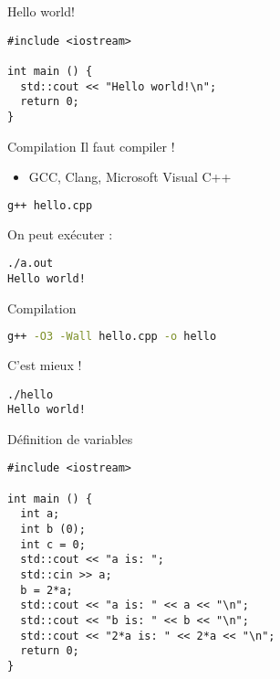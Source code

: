 
\begin{frame}[fragile]{Hello world!}
  \begin{lstlisting}
#include <iostream>

int main () {
  std::cout << "Hello world!\n";
  return 0;
}
  \end{lstlisting}
\end{frame}

\begin{frame}[fragile]{Compilation}
  Il faut compiler !
  \begin{itemize}
    \item GCC, Clang, Microsoft Visual C++
  \end{itemize}

  \begin{lstlisting}[language=bash]
g++ hello.cpp
  \end{lstlisting}

  On peut exécuter :
  \begin{lstlisting}
./a.out
Hello world!
  \end{lstlisting}
\end{frame}

\begin{frame}[fragile]{Compilation}
  \begin{lstlisting}[language=bash]
g++ -O3 -Wall hello.cpp -o hello
  \end{lstlisting}

  C'est mieux !
  \begin{lstlisting}
./hello
Hello world!
  \end{lstlisting}
\end{frame}

\begin{frame}[fragile]{Définition de variables}
  \begin{lstlisting}
#include <iostream>

int main () {
  int a;
  int b (0);
  int c = 0;
  std::cout << "a is: ";
  std::cin >> a;
  b = 2*a;
  std::cout << "a is: " << a << "\n";
  std::cout << "b is: " << b << "\n";
  std::cout << "2*a is: " << 2*a << "\n";
  return 0;
}
  \end{lstlisting}
\end{frame}

